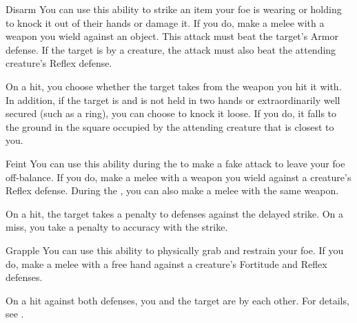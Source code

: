             \begin{ability}{Disarm}\label{Disarm}
                You can use this ability to strike an item your foe is wearing or holding to knock it out of their hands or damage it.
                If you do, make a melee  with a weapon you wield against an object.
                This attack must beat the target's Armor defense.
                If the target is  by a creature, the attack must also beat the attending creature's Reflex defense.

                On a hit, you choose whether the target takes  from the weapon you hit it with.
                In addition, if the target is  and is not held in two hands or extraordinarily well secured (such as a ring), you can choose to knock it loose.
                If you do, it falls to the ground in the square occupied by the attending creature that is closest to you.
            \end{ability}

            \begin{ability}{Feint}\label{Feint}
                You can use this ability during the  to make a fake attack to leave your foe off-balance.
                If you do, make a melee  with a weapon you wield against a creature's Reflex defense.
                During the , you can also make a melee  with the same weapon.

                On a hit, the target takes a  penalty to defenses against the delayed strike.
                On a miss, you take a  penalty to accuracy with the strike.
            \end{ability}

            \begin{ability}{Grapple}\label{Grapple}
                You can use this ability to physically grab and restrain your foe.
                If you do, make a melee  with a free hand against a creature's Fortitude and Reflex defenses.

                On a hit against both defenses, you and the target are \grappled by each other.
                For details, see .
            \end{ability}

